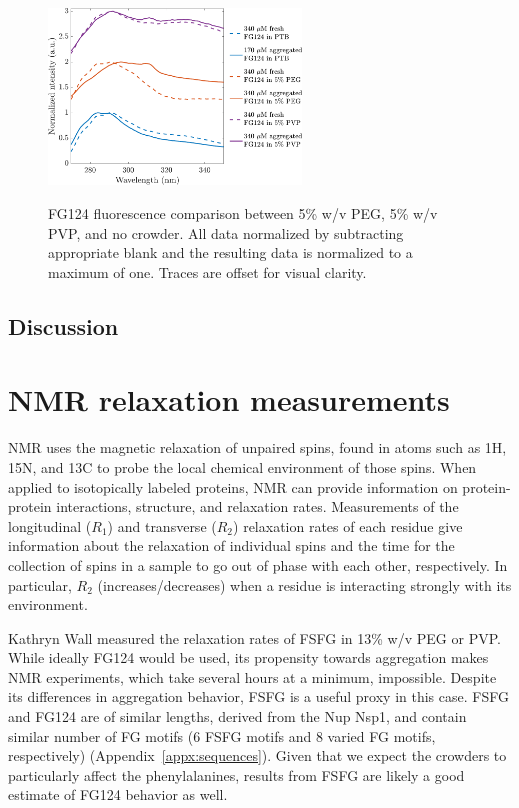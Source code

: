 \begin{figure}
\caption[FG124 fluorescence comparison between crowding agents.]{FG124 fluorescence comparison between 5\% w/v PEG, 5\% w/v PVP, and no crowder.  All data normalized by subtracting appropriate blank and the resulting data is normalized to a maximum of one.  Traces are offset for visual clarity.\\}
\centering
\includegraphics[width=0.6\textwidth]{figs/ch05/stacked-FG124-fluorimetry.pdf}
\label{fig:stacked-FG124-fluorimetry}
\end{figure}

\subsection{Discussion}


\section{NMR relaxation measurements}

NMR uses the magnetic relaxation of unpaired spins, found in atoms such as 1H, 15N, and 13C to probe the local chemical environment of those spins.  When applied to isotopically labeled proteins, NMR can provide information on protein-protein interactions, structure, and relaxation rates.  Measurements of the longitudinal ($R_1$) and transverse ($R_2$) relaxation rates of each residue give information about the relaxation of individual spins and the time for the collection of spins in a sample to go out of phase with each other, respectively.  In particular, $R_2$ (increases/decreases) when a residue is interacting strongly with its environment.

Kathryn Wall measured the relaxation rates of FSFG in 13\% w/v PEG or PVP.  While ideally FG124 would be used, its propensity towards aggregation makes NMR experiments, which take several hours at a minimum, impossible.  Despite its differences in aggregation behavior, FSFG is a useful proxy in this case.  FSFG and FG124 are of similar lengths, derived from the Nup Nsp1, and contain similar number of FG motifs (6 FSFG motifs and 8 varied FG motifs, respectively) (Appendix~\ref{appx:sequences}).  Given that we expect the crowders to particularly affect the phenylalanines, results from FSFG are likely a good estimate of FG124 behavior as well.

